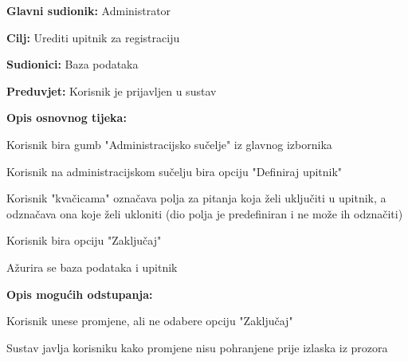 					\noindent {}
					\begin{packed_item}
						\item \textbf{Glavni sudionik:} Administrator
						\item \textbf{Cilj:} Urediti upitnik za registraciju
						\item \textbf{Sudionici:} Baza podataka
						\item \textbf{Preduvjet:} Korisnik je prijavljen u sustav
						
						\item \textbf{Opis osnovnog tijeka:} 
						\item[] \begin{packed_enum}
							\item Korisnik bira gumb "Administracijsko sučelje" iz glavnog izbornika
							\item Korisnik na administracijskom sučelju bira opciju "Definiraj upitnik"
							\item Korisnik "kvačicama" označava polja za pitanja koja želi uključiti u upitnik, a odznačava ona koje želi ukloniti (dio polja je predefiniran i ne može ih odznačiti)
							\item Korisnik bira opciju "Zaključaj"
							\item Ažurira se baza podataka i upitnik
						\end{packed_enum}
					
						\item \textbf{Opis mogućih odstupanja:}
						\item[] \begin{packed_enum}

							\item[4.a] Korisnik unese promjene, ali ne odabere opciju "Zaključaj"
							\item[] \begin{packed_enum}
								\item[1.] Sustav javlja korisniku kako promjene nisu pohranjene prije izlaska iz prozora
							\end{packed_enum}
							
						\end{packed_enum}                            
					\end{packed_item}


